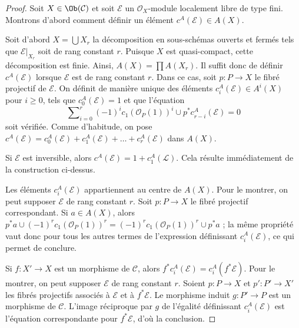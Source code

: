 \begin{proof}
Soit $X \in \Ob(\mathcal{C})$ et soit $\mathcal{E}$ un
$\mathcal{O}_X$-module localement libre de type fini. Montrons d'abord comment définir
un élément $c^A(\mathcal{E}) \in A(X)$.

\medskip\noindent
Soit d'abord $X = \bigcup X_r$ la décomposition en
sous-schémas ouverts et fermés tels que $\mathcal{E}|_{X_r}$ soit
de rang constant $r$. Puisque $X$ est quasi-compact, cette décomposition
est finie. Ainsi, $A(X) = \prod A(X_r)$. Il suffit donc de définir
$c^A(\mathcal{E})$ lorsque $\mathcal{E}$ est de rang constant $r$. Dans
ce cas, soit $p : P \to X$ le fibré projectif de $\mathcal{E}$.
On définit de manière unique des éléments $c_i^A(\mathcal{E}) \in A^i(X)$
pour $i \geq 0$, tels que $c_0^A(\mathcal{E}) = 1$ et que l'équation
\begin{equation}
\label{equation-chern-classes}
\sum\nolimits_{i = 0}^r
(-1)^i c_1(\mathcal{O}_P(1))^i \cup p^*c^A_{r - i}(\mathcal{E})
= 0
\end{equation}
soit vérifiée. Comme d'habitude, on pose
$c^A(\mathcal{E}) = c_0^A(\mathcal{E}) + c_1^A(\mathcal{E}) + \ldots
+ c_r^A(\mathcal{E})$ dans $A(X)$.

\medskip\noindent
Si $\mathcal{E}$ est inversible, alors
$c^A(\mathcal{E}) = 1 + c_1^A(\mathcal{L})$.
Cela résulte immédiatement de la construction ci-dessus.

\medskip\noindent
Les éléments $c_i^A(\mathcal{E})$ appartiennent au centre de $A(X)$.
Pour le montrer, on peut supposer $\mathcal{E}$ de rang constant $r$.
Soit $p : P \to X$ le fibré projectif correspondant.
Si $a \in A(X)$, alors $p^*a \cup (-1)^r c_1(\mathcal{O}_P(1))^r =
(-1)^r c_1(\mathcal{O}_P(1))^r \cup p^*a$ ; la même propriété vaut donc
pour tous les autres termes de l'expression définissant $c_i^A(\mathcal{E})$,
ce qui permet de conclure.

\medskip\noindent
Si $f : X' \to X$ est un morphisme de $\mathcal{C}$, alors
$f^*c_i^A(\mathcal{E}) = c_i^A(f^*\mathcal{E})$.
Pour le montrer, on peut supposer $\mathcal{E}$ de rang constant $r$.
Soient $p : P \to X$ et $p' : P' \to X'$ les fibrés
projectifs associés à $\mathcal{E}$ et à $f^*\mathcal{E}$.
Le morphisme induit $g : P' \to P$ est un morphisme de $\mathcal{C}$.
L'image réciproque par $g$ de l'égalité définissant $c_i^A(\mathcal{E})$
est l'équation correspondante pour $f^*\mathcal{E}$, d'où la conclusion.


\end{proof}
